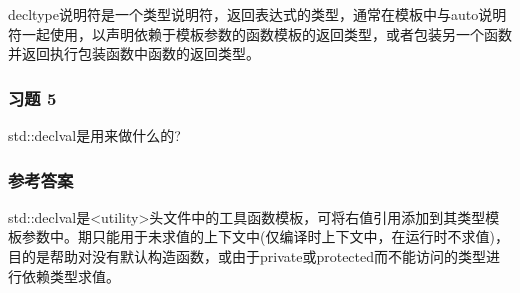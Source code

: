 decltype说明符是一个类型说明符，返回表达式的类型，通常在模板中与auto说明符一起使用，以声明依赖于模板参数的函数模板的返回类型，或者包装另一个函数并返回执行包装函数中函数的返回类型。

\subsubsection{习题 5}

std::declval是用来做什么的?

\subsubsection{参考答案}

std::declval是<utility>头文件中的工具函数模板，可将右值引用添加到其类型模板参数中。期只能用于未求值的上下文中(仅编译时上下文中，在运行时不求值)，目的是帮助对没有默认构造函数，或由于private或protected而不能访问的类型进行依赖类型求值。













